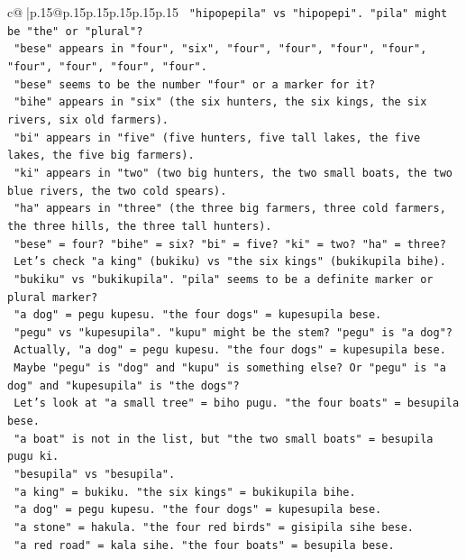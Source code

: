 \documentclass{article}
\begin{document}
{\begin{supertabular}{c@{$\;$}|p{.15\linewidth}@{}p{.15\linewidth}p{.15\linewidth}p{.15\linewidth}p{.15\linewidth}p{.15\linewidth}}
{{{\texttt{   "hipopepila" vs "hipopepi". "pila" might be "the" or "plural"?} \\
\texttt{   "bese" appears in "four", "six", "four", "four", "four", "four", "four", "four", "four", "four".} \\
\texttt{   "bese" seems to be the number "four" or a marker for it?} \\
\texttt{   "bihe" appears in "six" (the six hunters, the six kings, the six rivers, six old farmers).} \\
\texttt{   "bi" appears in "five" (five hunters, five tall lakes, the five lakes, the five big farmers).} \\
\texttt{   "ki" appears in "two" (two big hunters, the two small boats, the two blue rivers, the two cold spears).} \\
\texttt{   "ha" appears in "three" (the three big farmers, three cold farmers, the three hills, the three tall hunters).} \\
\texttt{   "bese" = four? "bihe" = six? "bi" = five? "ki" = two? "ha" = three?} \\
\texttt{   Let's check "a king" (bukiku) vs "the six kings" (bukikupila bihe).} \\
\texttt{   "bukiku" vs "bukikupila". "pila" seems to be a definite marker or plural marker?} \\
\texttt{   "a dog" = pegu kupesu. "the four dogs" = kupesupila bese.} \\
\texttt{   "pegu" vs "kupesupila". "kupu" might be the stem? "pegu" is "a dog"?} \\
\texttt{   Actually, "a dog" = pegu kupesu. "the four dogs" = kupesupila bese.} \\
\texttt{   Maybe "pegu" is "dog" and "kupu" is something else? Or "pegu" is "a dog" and "kupesupila" is "the dogs"?} \\
\texttt{   Let's look at "a small tree" = biho pugu. "the four boats" = besupila bese.} \\
\texttt{   "a boat" is not in the list, but "the two small boats" = besupila pugu ki.} \\
\texttt{   "besupila" vs "besupila".} \\
\texttt{   "a king" = bukiku. "the six kings" = bukikupila bihe.} \\
\texttt{   "a dog" = pegu kupesu. "the four dogs" = kupesupila bese.} \\
\texttt{   "a stone" = hakula. "the four red birds" = gisipila sihe bese.} \\
\texttt{   "a red road" = kala sihe. "the four boats" = besupila bese.} \\
}}}
\end{supertabular}}
\end{document}
